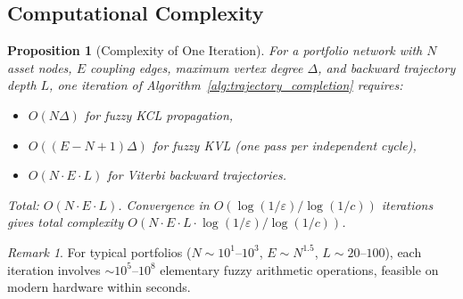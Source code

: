 \documentclass[twocolumn,10pt]{article}
\newtheorem{proposition}[theorem]{Proposition}
\theoremstyle{remark}
\newtheorem{remark}[theorem]{Remark}
\begin{document}
\subsection{Computational Complexity}

\begin{proposition}[Complexity of One Iteration]
\label{prop:complexity}
For a portfolio network with $N$ asset nodes, $E$ coupling edges, maximum vertex degree $\Delta$, and backward trajectory depth $L$, one iteration of Algorithm~\ref{alg:trajectory_completion} requires:
\begin{itemize}
    \item $O(N\Delta)$ for fuzzy KCL propagation,
    \item $O((E - N + 1)\Delta)$ for fuzzy KVL (one pass per independent cycle),
    \item $O(N \cdot E \cdot L)$ for Viterbi backward trajectories.
\end{itemize}
Total: $O(N \cdot E \cdot L)$.  Convergence in $O(\log(1/\varepsilon) / \log(1/c))$ iterations gives total complexity $O(N \cdot E \cdot L \cdot \log(1/\varepsilon) / \log(1/c))$.
\end{proposition}

\begin{remark}
For typical portfolios ($N \sim 10^1$--$10^3$, $E \sim N^{1.5}$, $L \sim 20$--$100$), each iteration involves $\sim 10^5$--$10^8$ elementary fuzzy arithmetic operations, feasible on modern hardware within seconds.
\end{remark}
\end{document}
